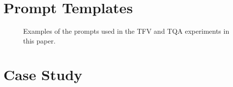 \section{Prompt Templates}\label{apdx:prompt}

\begin{figure}[H]
    \centering
  \begin{minipage}[t]{\linewidth} %
  \end{minipage}
  \begin{minipage}[t]{\linewidth} %
  \end{minipage}
  \caption{Examples of the prompts used in the TFV and TQA experiments in this paper.}
    \label{fig:prompts}
\end{figure}

\section{Case Study}\label{apdx:case}




